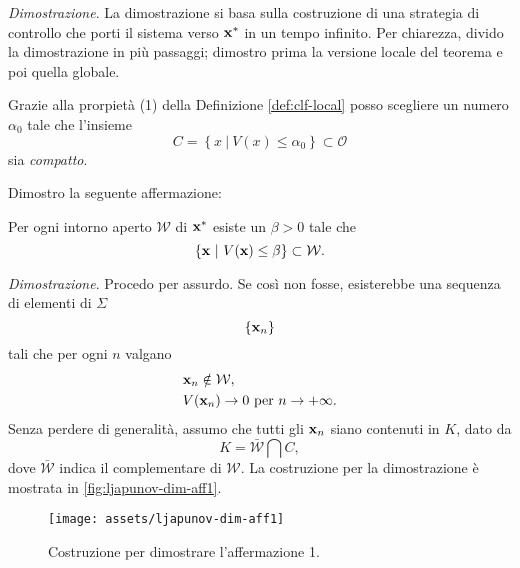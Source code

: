 \emph{Dimostrazione}.
La dimostrazione si basa sulla costruzione di una strategia di
controllo che porti il sistema verso $\mathbf{x}^*$ in un tempo infinito.
Per chiarezza, divido la dimostrazione in più passaggi; dimostro prima la versione locale
del teorema e poi quella globale.
\begin{steps}
    \item Grazie alla prorpietà (1) della Definizione \ref{def:clf-local}
    posso scegliere un numero $\alpha_0$ tale che l'insieme
    \begin{equation}
        C = \left\{ x\ |\ V(x) \leq \alpha_0 \right\} \subset \mathcal O
        \label{eq:alpha_0}
    \end{equation}
    sia \emph{compatto}.

    Dimostro la seguente affermazione:

    \begin{aff}
        Per ogni intorno aperto $\mathcal W$ di $\mathbf{x}^*$ esiste
        un $\beta > 0$ tale che
        \begin{equation*}
            \{\mathbf{x}\ |\ V(\mathbf{x}) \leq \beta\} \subset \mathcal W.
        \end{equation*}
    \end{aff}

    \emph{Dimostrazione}.
    Procedo per assurdo.
    Se così non fosse, esisterebbe una sequenza di elementi di $\Sigma$
    \begin{equation*}
    \{\mathbf{x}_n\}
    \end{equation*}
    tali che per ogni $n$
    valgano
    \begin{align*}
        &\mathbf{x}_n \notin \mathcal W, \\
        &V(\mathbf{x}_n) \to 0 \text{ per } n \to +\infty.
    \end{align*}
    Senza perdere di generalità, assumo che tutti gli $\mathbf{x}_n$
    siano contenuti in $K$, dato da
    \begin{equation*}
        K = \bar{\mathcal W} \bigcap C,
    \end{equation*}
    dove $\bar{\mathcal W}$ indica il complementare di $\mathcal W$.
    La costruzione per la dimostrazione è mostrata in \autoref{fig:ljapunov-dim-aff1}.

    \hfill
    \begin{minipage}{.8\textwidth}
        \begin{figure}[H]
            \centering
            \texttt{[image: assets/ljapunov-dim-aff1]}
            \caption[Costruzione 1 per teorema di Ljapunov]{Costruzione per dimostrare
            l'affermazione 1.}
            \label{fig:ljapunov-dim-aff1}
        \end{figure}
    \end{minipage}


\end{steps}
